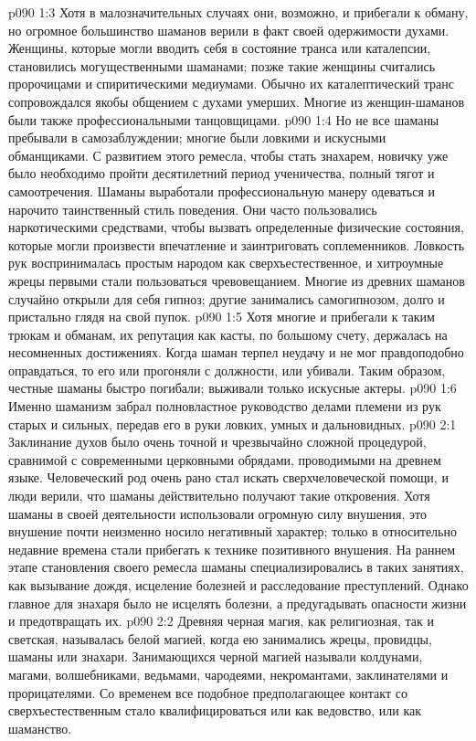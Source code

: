 \vs p090 1:3 Хотя в малозначительных случаях они, возможно, и прибегали к обману, но огромное большинство шаманов верили в факт своей одержимости духами. Женщины, которые могли вводить себя в состояние транса или каталепсии, становились могущественными шаманами; позже такие женщины считались пророчицами и спиритическими медиумами. Обычно их каталептический транс сопровождался якобы общением с духами умерших. Многие из женщин\hyp{}шаманов были также профессиональными танцовщицами.
\vs p090 1:4 Но не все шаманы пребывали в самозаблуждении; многие были ловкими и искусными обманщиками. С развитием этого ремесла, чтобы стать знахарем, новичку уже было необходимо пройти десятилетний период ученичества, полный тягот и самоотречения. Шаманы выработали профессиональную манеру одеваться и нарочито таинственный стиль поведения. Они часто пользовались наркотическими средствами, чтобы вызвать определенные физические состояния, которые могли произвести впечатление и заинтриговать соплеменников. Ловкость рук воспринималась простым народом как сверхъестественное, и хитроумные жрецы первыми стали пользоваться чревовещанием. Многие из древних шаманов случайно открыли для себя гипноз; другие занимались самогипнозом, долго и пристально глядя на свой пупок.
\vs p090 1:5 Хотя многие и прибегали к таким трюкам и обманам, их репутация как касты, по большому счету, держалась на несомненных достижениях. Когда шаман терпел неудачу и не мог правдоподобно оправдаться, то его или прогоняли с должности, или убивали. Таким образом, честные шаманы быстро погибали; выживали только искусные актеры.
\vs p090 1:6 Именно шаманизм забрал полновластное руководство делами племени из рук старых и сильных, передав его в руки ловких, умных и дальновидных.
\vs p090 2:1 Заклинание духов было очень точной и чрезвычайно сложной процедурой, сравнимой с современными церковными обрядами, проводимыми на древнем языке. Человеческий род очень рано стал искать сверхчеловеческой помощи,  и люди верили, что шаманы действительно получают такие откровения. Хотя шаманы в своей деятельности использовали огромную силу внушения, это внушение почти неизменно носило негативный характер; только в относительно недавние времена стали прибегать к технике позитивного внушения. На раннем этапе становления своего ремесла шаманы специализировались в таких занятиях, как вызывание дождя, исцеление болезней и расследование преступлений. Однако главное для знахаря было не исцелять болезни, а предугадывать опасности жизни и предотвращать их.
\vs p090 2:2 Древняя черная магия, как религиозная, так и светская, называлась белой магией, когда ею занимались жрецы, провидцы, шаманы или знахари. Занимающихся черной магией называли колдунами, магами, волшебниками, ведьмами, чародеями, некромантами, заклинателями и прорицателями. Со временем все подобное предполагающее контакт со сверхъестественным стало квалифицироваться или как ведовство, или как шаманство.
